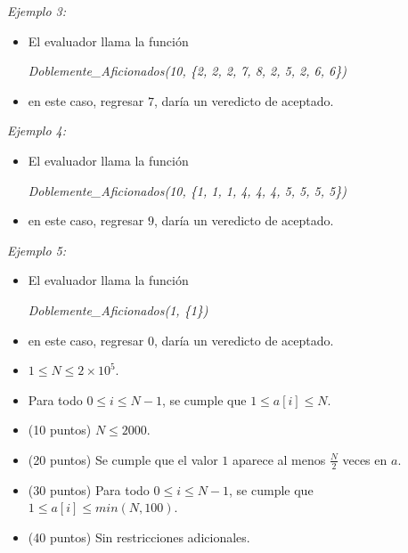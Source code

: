 \documentclass[12pt]{scrartcl}
\begin{document}
        {\itshape Ejemplo 3:}
        \begin{itemize}
            \item El evaluador llama la función 
            
            \begin{center}
                {\itshape Doblemente\_Aficionados(10, \{2, 2, 2, 7, 8, 2, 5, 2, 6, 6\})}
            \end{center}

            \item en este caso, regresar $7$, daría un veredicto de aceptado.
        \end{itemize}

        {\itshape Ejemplo 4:}
        \begin{itemize}
            \item El evaluador llama la función 

            \begin{center}
                {\itshape Doblemente\_Aficionados(10, \{1, 1, 1, 4, 4, 4, 5, 5, 5, 5\})}
            \end{center}

            \item en este caso, regresar $9$, daría un veredicto de aceptado.
        \end{itemize}
        
        {\itshape Ejemplo 5:}
        \begin{itemize}
            \item El evaluador llama la función 

            \begin{center}
                {\itshape Doblemente\_Aficionados(1, \{1\})}
            \end{center}

            \item en este caso, regresar $0$, daría un veredicto de aceptado.
        \end{itemize}
        
        \begin{itemize}
            \item $1 \le N \le 2 \times 10^5$.
            \item Para todo $0 \le i \le N - 1$, se cumple que $1 \le a[i] \le N$.
        \end{itemize}
    


    \begin{itemize}
        \item (10 puntos) $N \le 2000$.
        \item (20 puntos) Se cumple que el valor $1$ aparece al menos $\frac{N}{2}$ veces en $a$.
        \item (30 puntos) Para todo $0 \le i \le N - 1$, se cumple que $1 \le a[i] \le min(N, 100)$.
        \item (40 puntos) Sin restricciones adicionales.
    \end{itemize}
\end{document}
